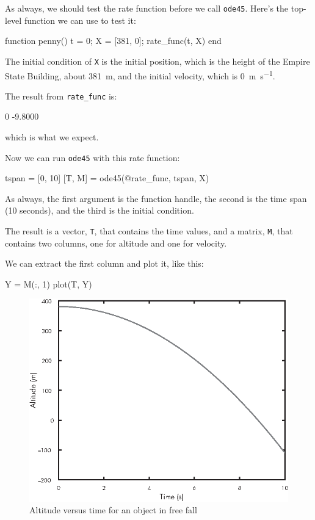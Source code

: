 
As always, we should test the rate function before we call \lstinline{ode45}.  Here's the top-level function we can use to test it:

\begin{code}
function penny()
   t = 0;
   X = [381, 0];
   rate_func(t, X)
end
\end{code}

The initial condition of \lstinline{X} is the initial position, which is the height of the Empire State Building, about \SI{381}{\meter}, and the initial velocity, which is \SI{0}{\meter \per \second}.


The result from \lstinline{rate_func} is:

\begin{code}
    0
   -9.8000
\end{code}
which is what we expect.

Now we can run \lstinline{ode45} with this rate function:

\begin{code}
tspan = [0, 10]
[T, M] = ode45(@rate_func, tspan, X)
\end{code}

As always, the first argument is the function handle, the second
is the time span (10 seconds), and the third is the initial
condition.

The result is a vector, \lstinline{T}, that contains the time values, and a matrix, \lstinline{M}, that contains two columns, one for altitude and one for velocity.

We can extract the first column and plot it, like this:

\begin{code}
Y = M(:, 1)
plot(T, Y)
\end{code}


\begin{figure}
\includegraphics{book/images/figure11_01_new.eps}
\caption{Altitude versus time for an object in free fall}
\label{fig:penny}
\end{figure}

